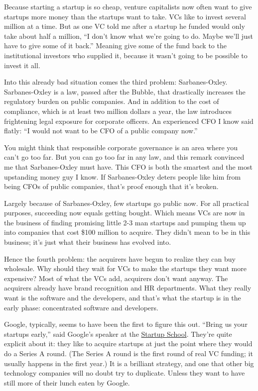 Because starting a startup is so cheap, venture capitalists now often
want to give startups more money than the startups want to take. VCs
like to invest several million at a time. But as one VC told me after a
startup he funded would only take about half a million, ``I don't know
what we're going to do. Maybe we'll just have to give some of it back.''
Meaning give some of the fund back to the institutional investors who
supplied it, because it wasn't going to be possible to invest it all.

Into this already bad situation comes the third problem: Sarbanes-Oxley.
Sarbanes-Oxley is a law, passed after the Bubble, that drastically
increases the regulatory burden on public companies. And in addition to
the cost of compliance, which is at least two million dollars a year,
the law introduces frightening legal exposure for corporate officers. An
experienced CFO I know said flatly: ``I would not want to be CFO of a
public company now.''

You might think that responsible corporate governance is an area where
you can't go too far. But you can go too far in any law, and this remark
convinced me that Sarbanes-Oxley must have. This CFO is both the
smartest and the most upstanding money guy I know. If Sarbanes-Oxley
deters people like him from being CFOs of public companies, that's proof
enough that it's broken.

Largely because of Sarbanes-Oxley, few startups go public now. For all
practical purposes, succeeding now equals getting bought. Which means
VCs are now in the business of finding promising little 2-3 man startups
and pumping them up into companies that cost \$100 million to acquire.
They didn't mean to be in this business; it's just what their business
has evolved into.

Hence the fourth problem: the acquirers have begun to realize they can
buy wholesale. Why should they wait for VCs to make the startups they
want more expensive? Most of what the VCs add, acquirers don't want
anyway. The acquirers already have brand recognition and HR departments.
What they really want is the software and the developers, and that's
what the startup is in the early phase: concentrated software and
developers.

Google, typically, seems to have been the first to figure this out.
``Bring us your startups early,'' said Google's speaker at the
\href{http://startupschool.org}{Startup School}. They're quite explicit
about it: they like to acquire startups at just the point where they
would do a Series A round. (The Series A round is the first round of
real VC funding; it usually happens in the first year.) It is a
brilliant strategy, and one that other big technology companies will no
doubt try to duplicate. Unless they want to have still more of their
lunch eaten by Google.

